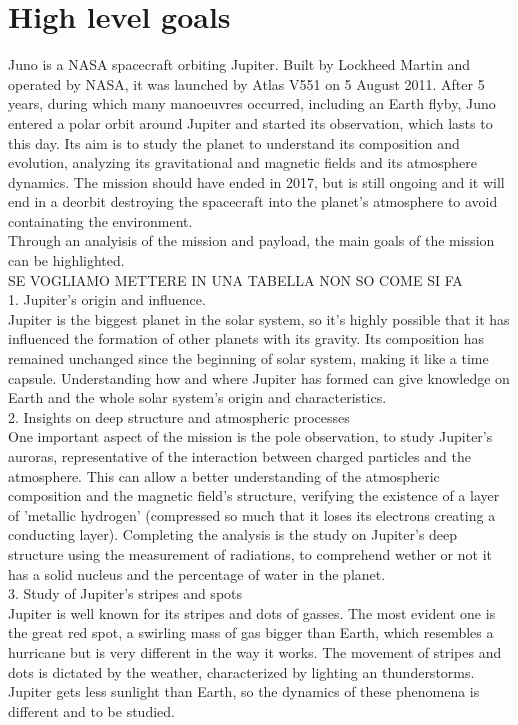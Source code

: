 \section{High level goals}
\label{sec:goals}
Juno is a NASA spacecraft orbiting Jupiter. Built by Lockheed Martin and operated by NASA, it was launched by Atlas V551 on 5 August 2011. After 5 years, during which many manoeuvres occurred, including an Earth flyby, Juno entered a polar orbit around Jupiter and started its observation, which lasts to this day. Its aim is to study the planet to understand its composition and evolution, analyzing its gravitational and magnetic fields and its atmosphere dynamics. The mission should have ended in 2017, but is still ongoing and it will end in a deorbit destroying the spacecraft into the planet's atmosphere to avoid containating the environment. 
\\

Through an analyisis of the mission and payload, the main goals of the mission can be highlighted. \\


SE VOGLIAMO METTERE IN UNA TABELLA NON SO COME SI FA \\

1. Jupiter's origin and influence. \\
Jupiter is the biggest planet in the solar system, so it's highly possible that it has influenced the formation of other planets with its gravity. Its composition has remained unchanged since the beginning of solar system, making it like a time capsule. Understanding how and where Jupiter has formed can give knowledge on Earth and the whole solar system's origin and characteristics.\\

2. Insights on deep structure and atmospheric processes\\
One important aspect of the mission is the pole observation, to study Jupiter's auroras, representative of the interaction between charged particles and the atmosphere. This can allow a better understanding of the atmospheric composition and the magnetic field's structure, verifying the existence of a layer of 'metallic hydrogen' (compressed so much that it loses its electrons creating a conducting layer). Completing the analysis is the study on Jupiter's deep structure using the measurement of radiations, to comprehend wether or not it has a solid nucleus and the percentage of water in the planet.\\

3. Study of Jupiter's stripes and spots\\
Jupiter is well known for its stripes and dots of gasses. The most evident one is the great red spot, a swirling mass of gas bigger than Earth, which resembles a hurricane but is very different in the way it works. The movement of stripes and dots is dictated by the weather, characterized by lighting an thunderstorms. Jupiter gets less sunlight than Earth, so the dynamics of these phenomena is different and to be studied. 






